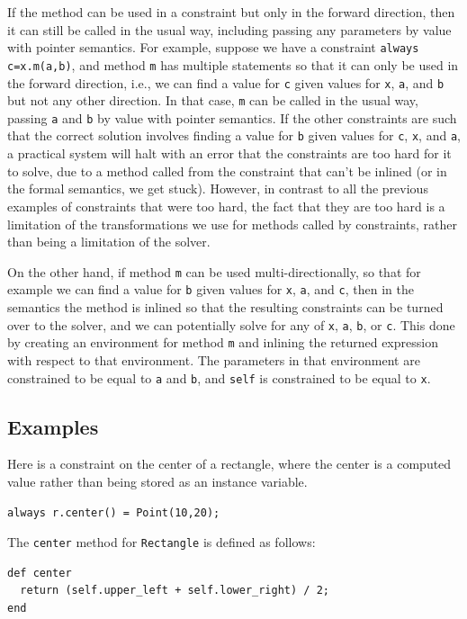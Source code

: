 \documentclass{article}
\begin{document}
If the method can be used in a constraint but only in the forward
direction, then it can still be called in the usual way, including
passing any parameters by value with pointer semantics.  For example,
suppose we have a constraint \verb|always c=x.m(a,b)|, and method
\verb|m| has multiple statements so that it can only be used in the
forward direction, i.e., we can find a value for \verb|c| given values
for \verb|x|, \verb|a|, and \verb|b| but not any other direction.  In
that case, \verb|m| can be called in the usual way, passing \verb|a|
and \verb|b| by value with pointer semantics.  If the other
constraints are such that the correct solution involves finding a
value for \verb|b| given values for \verb|c|, \verb|x|, and \verb|a|,
a practical system will halt with an error that the constraints are
too hard for it to solve, due to a method called from the constraint
that can't be inlined (or in the formal semantics, we get stuck).
However, in contrast to all the previous examples of constraints that
were too hard, the fact that they are too hard is a limitation of the
transformations we use for methods called by constraints, rather than
being a limitation of the solver.

On the other hand, if method \verb|m| can be used multi-directionally,
so that for example we can find a value for \verb|b| given values for
\verb|x|, \verb|a|, and \verb|c|, then in the semantics the method is
inlined so that the resulting constraints can be turned over to the
solver, and we can potentially solve for any of \verb|x|, \verb|a|,
\verb|b|, or \verb|c|.  This done by creating an environment for
method \verb|m| and inlining the returned expression with respect to
that environment. The parameters in that environment are constrained
to be equal to \verb|a| and \verb|b|, and \verb|self| is constrained
to be equal to \verb|x|.

\subsection{Examples}

Here is a constraint on the center of a rectangle, where the center is
a computed value rather than being stored as an instance variable.

\begin{verbatim}
always r.center() = Point(10,20);
\end{verbatim}

The \verb|center| method for \verb|Rectangle| is defined as follows:
\begin{verbatim}
def center
  return (self.upper_left + self.lower_right) / 2;
end
\end{verbatim}
\end{document}
